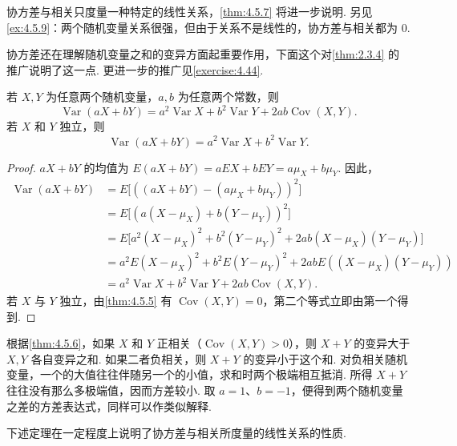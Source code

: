 协方差与相关只度量一种特定的线性关系，\autoref{thm:4.5.7} 将进一步说明. 另见\autoref{ex:4.5.9}：两个随机变量关系很强，但由于关系不是线性的，协方差与相关都为 0.

协方差还在理解随机变量之和的变异方面起重要作用，下面这个对\autoref{thm:2.3.4} 的推广说明了这一点. 更进一步的推广见\autoref{exercise:4.44}.
\begin{theorem}\label{thm:4.5.6}
若 $X,Y$ 为任意两个随机变量，$a,b$ 为任意两个常数，则
$$\operatorname{Var}(aX+bY)=a^2\operatorname{Var}X+b^2\operatorname{Var}Y+2ab\operatorname{Cov}(X,Y).$$
若 $X$ 和 $Y$ 独立，则
$$\operatorname{Var}(aX+bY)=a^2\operatorname{Var}X+b^2\operatorname{Var}Y.$$
\end{theorem}
\begin{proof}
$aX+bY$ 的均值为 $E(aX+bY)=aEX+bEY=a\mu_X+b\mu_Y$. 因此，
$$\begin{aligned}
\operatorname{Var}(aX+bY)&=E\bigl[((aX+bY)-(a\mu_X+b\mu_Y))^2\bigr]\\
&=E\bigl[(a(X-\mu_X)+b(Y-\mu_Y))^2\bigr]\\
&=E\bigl[a^2(X-\mu_X)^2+b^2(Y-\mu_Y)^2+2ab(X-\mu_X)(Y-\mu_Y)\bigr]\\
&=a^2E(X-\mu_X)^2+b^2E(Y-\mu_Y)^2+2abE((X-\mu_X)(Y-\mu_Y))\\
&=a^2\operatorname{Var}X+b^2\operatorname{Var}Y+2ab\operatorname{Cov}(X,Y).
\end{aligned}$$
若 $X$ 与 $Y$ 独立，由\autoref{thm:4.5.5} 有 $\operatorname{Cov}(X,Y)=0$，第二个等式立即由第一个得到.
\end{proof}
根据\autoref{thm:4.5.6}，如果 $X$ 和 $Y$ 正相关（$\operatorname{Cov}(X,Y)>0$），则 $X+Y$ 的变异大于 $X,Y$ 各自变异之和. 如果二者负相关，则 $X+Y$ 的变异小于这个和. 对负相关随机变量，一个的大值往往伴随另一个的小值，求和时两个极端相互抵消. 所得 $X+Y$ 往往没有那么多极端值，因而方差较小. 取 $a=1$、$b=-1$，便得到两个随机变量之差的方差表达式，同样可以作类似解释.

下述定理在一定程度上说明了协方差与相关所度量的线性关系的性质.

